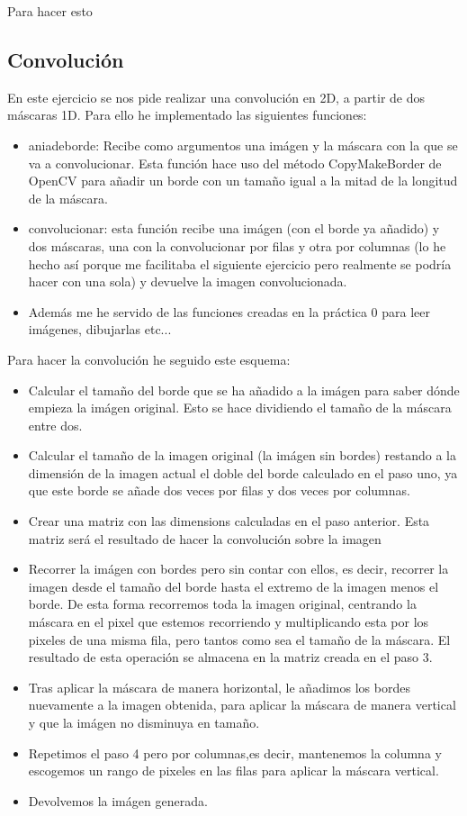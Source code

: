 \documentclass[12pt,spanish]{article}
\begin{document}
Para hacer esto

\subsection{Convolución}
En este ejercicio se nos pide realizar una convolución en 2D, a partir de dos máscaras 1D. Para ello he implementado las siguientes funciones:

\begin{itemize}
	\item aniadeborde: Recibe como argumentos una imágen y la máscara con la que se va a convolucionar. Esta función hace uso del método CopyMakeBorder de OpenCV para añadir un borde con un tamaño igual a la mitad de la longitud de la máscara.
	\item convolucionar: esta función recibe una imágen (con el borde ya añadido) y dos máscaras, una con la convolucionar por filas y otra por columnas (lo he hecho así porque me facilitaba el siguiente ejercicio pero realmente se podría hacer con una sola) y devuelve la imagen convolucionada.
	\item Además me he servido de las funciones creadas en la práctica 0 para leer imágenes, dibujarlas etc...
\end{itemize}

Para hacer la convolución he seguido este esquema:

\begin{itemize}
	\item Calcular el tamaño del borde que se ha añadido a la imágen para saber dónde empieza la imágen original. Esto se hace dividiendo el tamaño de la máscara entre dos.
	\item Calcular el tamaño de la imagen original (la imágen sin bordes) restando a la dimensión de la imagen actual el doble del borde calculado en el paso uno, ya que este borde se añade dos veces por filas y dos veces por columnas.
	\item Crear una matriz con las dimensions calculadas en el paso anterior. Esta matriz será el resultado de hacer la convolución sobre la imagen
	\item Recorrer la imágen con bordes pero sin contar con ellos, es decir, recorrer la imagen desde el tamaño del borde hasta el extremo de la imagen menos el borde. De esta forma recorremos toda la imagen original, centrando la máscara en el pixel que estemos recorriendo y multiplicando esta por los pixeles de una misma fila, pero tantos como sea el tamaño de la máscara. El resultado de esta operación se almacena en la matriz creada en el paso 3.
	\item Tras aplicar la máscara de manera horizontal, le añadimos los bordes nuevamente a la imagen obtenida, para aplicar la máscara de manera vertical y que la imágen no disminuya en tamaño.
	\item Repetimos el paso 4 pero por columnas,es decir, mantenemos la columna y escogemos un rango de pixeles en las filas para aplicar la máscara vertical.
	\item Devolvemos la imágen generada.
\end{itemize}
\end{document}
